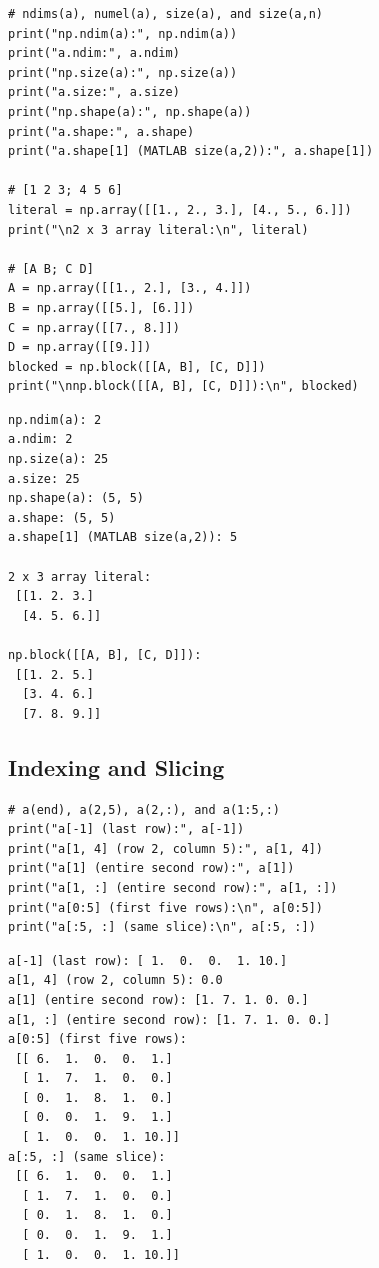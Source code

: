 \documentclass[11pt]{article}
\begin{document}
\begin{lstlisting}[style=python]
# ndims(a), numel(a), size(a), and size(a,n)
print("np.ndim(a):", np.ndim(a))
print("a.ndim:", a.ndim)
print("np.size(a):", np.size(a))
print("a.size:", a.size)
print("np.shape(a):", np.shape(a))
print("a.shape:", a.shape)
print("a.shape[1] (MATLAB size(a,2)):", a.shape[1])

# [1 2 3; 4 5 6]
literal = np.array([[1., 2., 3.], [4., 5., 6.]])
print("\n2 x 3 array literal:\n", literal)

# [A B; C D]
A = np.array([[1., 2.], [3., 4.]])
B = np.array([[5.], [6.]])
C = np.array([[7., 8.]])
D = np.array([[9.]])
blocked = np.block([[A, B], [C, D]])
print("\nnp.block([[A, B], [C, D]]):\n", blocked)
\end{lstlisting}

\begin{lstlisting}[style=terminal]
np.ndim(a): 2
a.ndim: 2
np.size(a): 25
a.size: 25
np.shape(a): (5, 5)
a.shape: (5, 5)
a.shape[1] (MATLAB size(a,2)): 5

2 x 3 array literal:
 [[1. 2. 3.]
  [4. 5. 6.]]

np.block([[A, B], [C, D]]):
 [[1. 2. 5.]
  [3. 4. 6.]
  [7. 8. 9.]]
\end{lstlisting}

\subsection{Indexing and Slicing}

\begin{lstlisting}[style=python]
# a(end), a(2,5), a(2,:), and a(1:5,:)
print("a[-1] (last row):", a[-1])
print("a[1, 4] (row 2, column 5):", a[1, 4])
print("a[1] (entire second row):", a[1])
print("a[1, :] (entire second row):", a[1, :])
print("a[0:5] (first five rows):\n", a[0:5])
print("a[:5, :] (same slice):\n", a[:5, :])
\end{lstlisting}

\begin{lstlisting}[style=terminal]
a[-1] (last row): [ 1.  0.  0.  1. 10.]
a[1, 4] (row 2, column 5): 0.0
a[1] (entire second row): [1. 7. 1. 0. 0.]
a[1, :] (entire second row): [1. 7. 1. 0. 0.]
a[0:5] (first five rows):
 [[ 6.  1.  0.  0.  1.]
  [ 1.  7.  1.  0.  0.]
  [ 0.  1.  8.  1.  0.]
  [ 0.  0.  1.  9.  1.]
  [ 1.  0.  0.  1. 10.]]
a[:5, :] (same slice):
 [[ 6.  1.  0.  0.  1.]
  [ 1.  7.  1.  0.  0.]
  [ 0.  1.  8.  1.  0.]
  [ 0.  0.  1.  9.  1.]
  [ 1.  0.  0.  1. 10.]]
\end{lstlisting}
\end{document}
